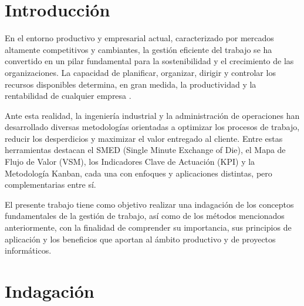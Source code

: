\documentclass[12pt, letterpaper]{article}
\begin{document}
\setcounter{page}{1}
\renewcommand{\contentsname}{Índice de Contenido}
\tableofcontents
\newpage

\setcounter{page}{1}
\justifying

\section{Introducción}

En el entorno productivo y empresarial actual, caracterizado por mercados altamente competitivos y
cambiantes, la gestión eficiente del trabajo se ha convertido en un pilar fundamental para la
sostenibilidad y el crecimiento de las organizaciones. La capacidad de planificar, organizar, dirigir
y controlar los recursos disponibles determina, en gran medida, la productividad y la rentabilidad
de cualquier empresa \cite{mrpeasy2023}.

Ante esta realidad, la ingeniería industrial y la administración de operaciones han desarrollado
diversas metodologías orientadas a optimizar los procesos de trabajo, reducir los desperdicios y
maximizar el valor entregado al cliente. Entre estas herramientas destacan el SMED (Single Minute
Exchange of Die), el Mapa de Flujo de Valor (VSM), los Indicadores Clave de Actuación (KPI) y la
Metodología Kanban, cada una con enfoques y aplicaciones distintas, pero complementarias entre sí.

El presente trabajo tiene como objetivo realizar una indagación de los conceptos fundamentales de la
gestión de trabajo, así como de los métodos mencionados anteriormente, con la finalidad de
comprender su importancia, sus principios de aplicación y los beneficios que aportan al ámbito
productivo y de proyectos informáticos.

\section{Indagación}
\end{document}
